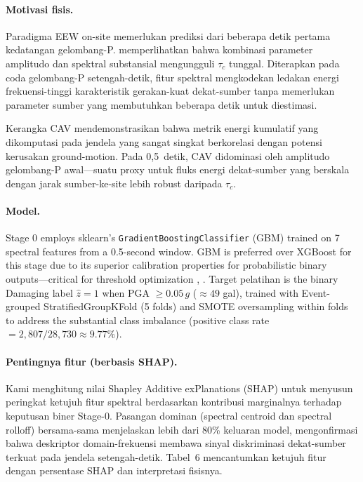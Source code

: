\documentclass[10pt]{article}
\renewcommand{\cite}[1]{\citep{#1}}
\begin{document}
\paragraph{Motivasi fisis.} Paradigma EEW on-site \cite{ref17} memerlukan prediksi dari beberapa detik pertama kedatangan gelombang-P. \citet{ref29} memperlihatkan bahwa kombinasi parameter amplitudo dan spektral substansial mengungguli \(\tau_c\) tunggal. Diterapkan pada coda gelombang-P setengah-detik, fitur spektral mengkodekan ledakan energi frekuensi-tinggi karakteristik gerakan-kuat dekat-sumber tanpa memerlukan parameter sumber yang membutuhkan beberapa detik untuk diestimasi.

Kerangka CAV \citet{ref55} mendemonstrasikan bahwa metrik energi kumulatif yang dikomputasi pada jendela yang sangat singkat berkorelasi dengan potensi kerusakan ground-motion. Pada 0,5~detik, CAV didominasi oleh amplitudo gelombang-P awal---suatu proxy untuk fluks energi dekat-sumber yang berskala dengan jarak sumber-ke-site lebih robust daripada \(\tau_c\).

\paragraph{Model.} Stage 0 employs sklearn's \texttt{GradientBoostingClassifier} (GBM) trained on 7 spectral features from a 0.5-second window. GBM is preferred over XGBoost for this stage due to its superior calibration properties for probabilistic binary outputs---critical for threshold optimization \cite{ref36}, \cite{ref39}. Target pelatihan is the binary Damaging label \(\hat z=1\) when PGA \(\geq 0.05\,g\) (\(\approx 49\) gal), trained with Event-grouped StratifiedGroupKFold (5 folds) and SMOTE oversampling within folds to address the substantial class imbalance (positive class rate \(=2{,}807/28{,}730 \approx 9.77\%\)).

\paragraph{Pentingnya fitur (berbasis SHAP).}

Kami menghitung nilai Shapley Additive exPlanations (SHAP) untuk menyusun peringkat ketujuh fitur spektral berdasarkan kontribusi marginalnya terhadap keputusan biner Stage-0. Pasangan dominan (spectral centroid dan spectral rolloff) bersama-sama menjelaskan lebih dari 80\% keluaran model, mengonfirmasi bahwa deskriptor domain-frekuensi membawa sinyal diskriminasi dekat-sumber terkuat pada jendela setengah-detik. Tabel~6 mencantumkan ketujuh fitur dengan persentase SHAP dan interpretasi fisisnya.
\end{document}
